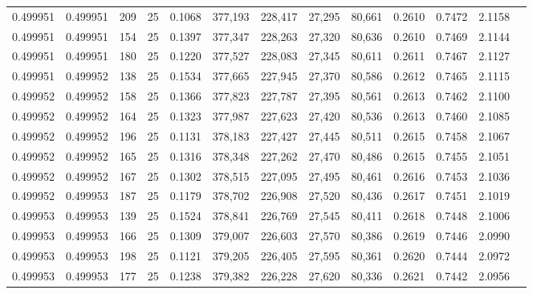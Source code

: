 \begin{tabular}{rrrrrrrrrrrrr}
0.499951 & 0.499951 &   209 &  25 &                                     0.1068 & 377,193 & 228,417 &  27,295 &  80,661 & 0.2610 & 0.7472 & 2.1158 \\
0.499951 & 0.499951 &   154 &  25 &                                     0.1397 & 377,347 & 228,263 &  27,320 &  80,636 & 0.2610 & 0.7469 & 2.1144 \\
0.499951 & 0.499951 &   180 &  25 &                                     0.1220 & 377,527 & 228,083 &  27,345 &  80,611 & 0.2611 & 0.7467 & 2.1127 \\
0.499951 & 0.499952 &   138 &  25 &                                     0.1534 & 377,665 & 227,945 &  27,370 &  80,586 & 0.2612 & 0.7465 & 2.1115 \\
0.499952 & 0.499952 &   158 &  25 &                                     0.1366 & 377,823 & 227,787 &  27,395 &  80,561 & 0.2613 & 0.7462 & 2.1100 \\
0.499952 & 0.499952 &   164 &  25 &                                     0.1323 & 377,987 & 227,623 &  27,420 &  80,536 & 0.2613 & 0.7460 & 2.1085 \\
0.499952 & 0.499952 &   196 &  25 &                                     0.1131 & 378,183 & 227,427 &  27,445 &  80,511 & 0.2615 & 0.7458 & 2.1067 \\
0.499952 & 0.499952 &   165 &  25 &                                     0.1316 & 378,348 & 227,262 &  27,470 &  80,486 & 0.2615 & 0.7455 & 2.1051 \\
0.499952 & 0.499952 &   167 &  25 &                                     0.1302 & 378,515 & 227,095 &  27,495 &  80,461 & 0.2616 & 0.7453 & 2.1036 \\
0.499952 & 0.499953 &   187 &  25 &                                     0.1179 & 378,702 & 226,908 &  27,520 &  80,436 & 0.2617 & 0.7451 & 2.1019 \\
0.499953 & 0.499953 &   139 &  25 &                                     0.1524 & 378,841 & 226,769 &  27,545 &  80,411 & 0.2618 & 0.7448 & 2.1006 \\
0.499953 & 0.499953 &   166 &  25 &                                     0.1309 & 379,007 & 226,603 &  27,570 &  80,386 & 0.2619 & 0.7446 & 2.0990 \\
0.499953 & 0.499953 &   198 &  25 &                                     0.1121 & 379,205 & 226,405 &  27,595 &  80,361 & 0.2620 & 0.7444 & 2.0972 \\
0.499953 & 0.499953 &   177 &  25 &                                     0.1238 & 379,382 & 226,228 &  27,620 &  80,336 & 0.2621 & 0.7442 & 2.0956 \\

\end{tabular}
